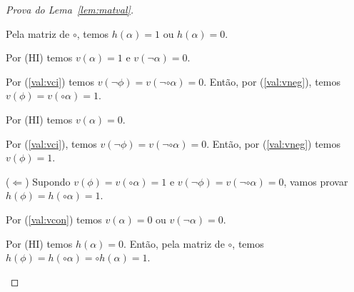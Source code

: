 \begin{proof}[Prova do Lema~\ref{lem:matval}]
\begin{provaporcasos}
\begin{provaporsubcasos}
                            Pela matriz de $\circ$, temos $h(\alpha) = 1$ ou $h(\alpha) = 0$.

                            \begin{provaporsubsubcasos}
                                    
                                    Por (HI) temos $v(\alpha) = 1$ e $v(\neg \alpha) = 0$.
                                
                                    Por (\ref{val:vci}) temos $v(\neg \phi) = v(\neg \circ \alpha) = 0$. Então, por (\ref{val:vneg}), temos $v(\phi) = v(\circ \alpha) = 1$.
                                
                                    
                                    Por (HI) temos $v(\alpha) = 0$.
                                
                                    Por (\ref{val:vci}), temos $v(\neg \phi) = v(\neg \circ \alpha) = 0$. Então, por (\ref{val:vneg}) temos $v(\phi) = 1$.

                                    \setcounter{buffer}{\theSubSubCasos}
                            \end{provaporsubsubcasos}
                            
                            ($\Longleftarrow$) Supondo $v(\phi) = v(\circ \alpha) = 1$ e $v(\neg \phi) = v(\neg \circ \alpha) = 0$, vamos provar $h(\phi) = h(\circ \alpha) = 1$.
                            
                            Por (\ref{val:vcon}) temos $v(\alpha) = 0$ ou $v(\neg \alpha) = 0$.

                            \begin{provaporsubsubcasos}
                                \setcounter{SubSubCasos}{\thebuffer}


                                    Por (HI) temos $h(\alpha) = 0$. Então, pela matriz de $\circ$, temos $h(\phi) = h(\circ \alpha) = \circ h(\alpha) = 1$.
                                


\end{provaporsubsubcasos}
\end{provaporsubcasos}
\end{provaporcasos}
\end{proof}
